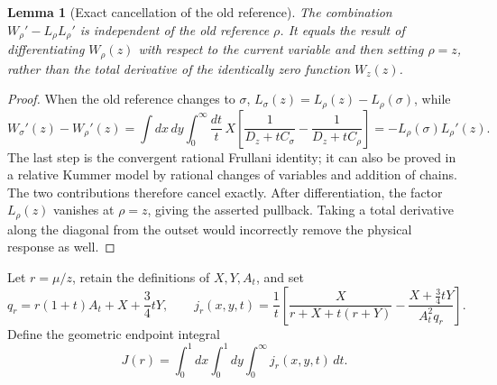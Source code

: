 \documentclass[11pt,a4paper,oneside]{article}
\theoremstyle{plain}
\newtheorem{lemma}[theorem]{Lemma}
\theoremstyle{definition}
\theoremstyle{remark}
\numberwithin{equation}{section}
\begin{document}
\begin{lemma}[Exact cancellation of the old reference]\label{momrg:lem:reference}
The combination $W_\rho'-L_\rho L_\rho'$ is independent of the old reference $\rho$.
It equals the result of differentiating $W_\rho(z)$ with respect to the current variable and then setting $\rho=z$,
rather than the total derivative of the identically zero function $W_z(z)$.
\end{lemma}
\begin{proof}
When the old reference changes to $\sigma$,
$L_\sigma(z)=L_\rho(z)-L_\rho(\sigma)$, while
\[
 W_\sigma'(z)-W_\rho'(z)
 =\int dx\,dy\int_0^\infty\frac{dt}{t}\,
 X\left[\frac1{D_z+tC_\sigma}-\frac1{D_z+tC_\rho}\right]
 =-L_\rho(\sigma)L_\rho'(z).
\]
The last step is the convergent rational Frullani identity;
it can also be proved in a relative Kummer model by rational changes of variables and addition of chains.
The two contributions therefore cancel exactly.
After differentiation, the factor $L_\rho(z)$ vanishes at $\rho=z$, giving the asserted pullback.
Taking a total derivative along the diagonal from the outset would incorrectly remove the physical response as well.
\end{proof}

Let $r=\mu/z$, retain the definitions of $X,Y,A_t$, and set
\[
 q_r=r(1+t)A_t+X+\frac34tY,\qquad
 j_r(x,y,t)=\frac1t
 \left[
  \frac{X}{r+X+t(r+Y)}
       -\frac{X+\frac34tY}{A_t^2q_r}
 \right].
\]
Define the geometric endpoint integral
\begin{equation}\label{momrg:eq:J}
 J(r)=\int_0^1dx\int_0^1dy\int_0^\infty j_r(x,y,t)\,dt.
\end{equation}
\end{document}
